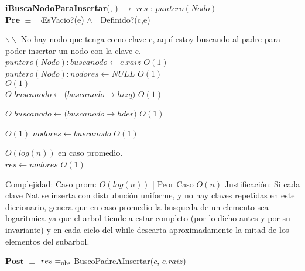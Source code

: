 \begin{algorithm}[H]{\textbf{iBuscaNodoParaInsertar}(, ) $\to$ $res$ : $puntero(Nodo)$}
	{\\ $\textbf{Pre}$ $\equiv$ $\neg$EsVacio?(e) $\land$ $\neg$Definido?(c,e)}
	\begin{algorithmic}[1]
		\State $\backslash\backslash$ No hay nodo que tenga como clave c, aquí estoy buscando al padre para poder insertar un nodo con la clave c. 
		\\

		\State $puntero(Nodo): buscanodo \gets e.raiz$ \Comment $O(1)$
		\State $puntero(Nodo): nodores \gets NULL$ \Comment $O(1)$
		\\

		 \Comment $O(1)$
			\\
			 \Comment $O$
				\State $buscanodo \gets (buscanodo$$\rightarrow$$hizq)$ \Comment $O(1)$

			 \Comment $O$
				\State $buscanodo \gets (buscanodo$$\rightarrow$$hder)$ \Comment $O(1)$

			 \Comment $O(1)$
				\State $nodores \gets buscanodo$ \Comment $O(1)$
			\EndIf

		\EndWhile \Comment $O(log(n))$ en caso promedio.
		\\

		\State $res \gets nodores$ \Comment $O(1)$

		\medskip
		\Statex \underline{Complejidad:} Caso prom: $O(log(n))$ | Peor Caso $O(n)$
		\Statex \underline{Justificación:} Si cada clave Nat se inserta con distrubución uniforme, y no hay claves repetidas en este diccionario, genera que en caso promedio la busqueda de un elemento sea logaritmica ya que el arbol tiende a estar completo (por lo dicho antes y por su invariante) y en cada ciclo del while descarta aproximadamente la mitad de los elementos del subarbol.

    \end{algorithmic}
    {$\textbf{Post}$ $\equiv$ $res =_{\mathrm{obs}}$ BuscoPadreAInsertar($c$, $e.raiz$)}
\end{algorithm}


